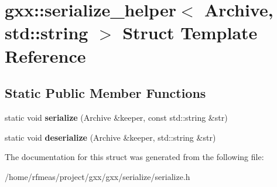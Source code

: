 \hypertarget{structgxx_1_1serialize__helper_3_01Archive_00_01std_1_1string_01_4}{}\section{gxx\+:\+:serialize\+\_\+helper$<$ Archive, std\+:\+:string $>$ Struct Template Reference}
\label{structgxx_1_1serialize__helper_3_01Archive_00_01std_1_1string_01_4}
\subsection*{Static Public Member Functions}
\begin{DoxyCompactItemize}
\item 
static void {\bfseries serialize} (Archive \&keeper, const std\+::string \&str)\hypertarget{structgxx_1_1serialize__helper_3_01Archive_00_01std_1_1string_01_4_a2cc0335b2d3719f2eca3c4d75af980d3}{}\label{structgxx_1_1serialize__helper_3_01Archive_00_01std_1_1string_01_4_a2cc0335b2d3719f2eca3c4d75af980d3}

\item 
static void {\bfseries deserialize} (Archive \&keeper, std\+::string \&str)\hypertarget{structgxx_1_1serialize__helper_3_01Archive_00_01std_1_1string_01_4_ae87285afd705b468b26c658dfddb4143}{}\label{structgxx_1_1serialize__helper_3_01Archive_00_01std_1_1string_01_4_ae87285afd705b468b26c658dfddb4143}

\end{DoxyCompactItemize}


The documentation for this struct was generated from the following file\+:\begin{DoxyCompactItemize}
\item 
/home/rfmeas/project/gxx/gxx/serialize/serialize.\+h\end{DoxyCompactItemize}

